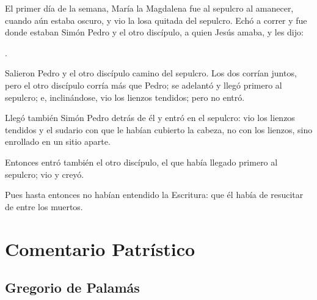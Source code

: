 \begin{scripture}
El primer día de la semana, María la Magdalena fue al sepulcro al amanecer, cuando aún estaba oscuro, y vio la losa quitada del sepulcro. Echó a correr y fue donde estaban Simón Pedro y el otro discípulo, a quien Jesús amaba, y les dijo: 

.

Salieron Pedro y el otro discípulo camino del sepulcro. Los dos corrían juntos, pero el otro discípulo corría más que Pedro; se adelantó y llegó primero al sepulcro; e, inclinándose, vio los lienzos tendidos; pero no entró. 

Llegó también Simón Pedro detrás de él y entró en el sepulcro: vio los lienzos tendidos y el sudario con que le habían cubierto la cabeza, no con los lienzos, sino enrollado en un sitio aparte. 

Entonces entró también el otro discípulo, el que había llegado primero al sepulcro; vio y creyó. 

Pues hasta entonces no habían entendido la Escritura: que él había de resucitar de entre los muertos.
\end{scripture}



\newsection 
\section{Comentario Patrístico}

\subsection{Gregorio de Palamás}




